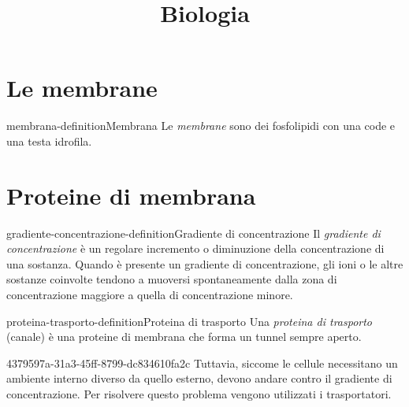 \documentclass[preview]{standalone}
\begin{document}
\title{Biologia}
\genpage

\section{Le membrane}

\begin{snippetdefinition}{membrana-definition}{Membrana}
    Le \textit{membrane} sono dei fosfolipidi con una code e una testa idrofila.
\end{snippetdefinition}




\section{Proteine di membrana}

\begin{snippetdefinition}{gradiente-concentrazione-definition}{Gradiente di concentrazione}
    Il \textit{gradiente di concentrazione} è un regolare incremento o diminuzione della concentrazione di una sostanza. Quando è presente un gradiente di concentrazione, gli ioni o le altre sostanze coinvolte tendono a muoversi spontaneamente dalla zona di concentrazione maggiore a quella di concentrazione minore.
\end{snippetdefinition}


\begin{snippetdefinition}{proteina-trasporto-definition}{Proteina di trasporto}
    Una \textit{proteina di trasporto} (canale) è una proteine di membrana che forma un tunnel sempre aperto.
\end{snippetdefinition}



\begin{snippet}{4379597a-31a3-45ff-8799-dc834610fa2c}
    Tuttavia, siccome le cellule necessitano un ambiente interno diverso da quello esterno,
devono andare contro il gradiente di concentrazione.
Per risolvere questo problema vengono utilizzati i trasportatori.
\end{snippet}
\end{document}
